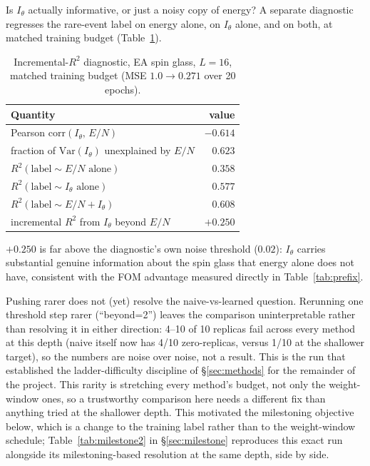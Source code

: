 \documentclass[a4paper,fleqn]{cas-sc}
\begin{document}
Is $I_\theta$ actually informative, or just a noisy copy of energy? A separate
diagnostic regresses the rare-event label on energy alone, on $I_\theta$ alone, and on
both, at matched training budget (Table~\ref{tab:diagnostic}).

\begin{table}[H]
\centering\small
\caption{Incremental-$R^2$ diagnostic, EA spin glass, $L=16$, matched training budget
	(MSE $1.0\to0.271$ over 20 epochs).}
\label{tab:diagnostic}
\begin{tabular}{lr}
	\toprule
	Quantity & value \\
	\midrule
	Pearson corr$(I_\theta,\,E/N)$ & $-0.614$ \\
	fraction of $\mathrm{Var}(I_\theta)$ unexplained by $E/N$ & $0.623$ \\
	$R^2(\text{label}\sim E/N\text{ alone})$ & $0.358$ \\
	$R^2(\text{label}\sim I_\theta\text{ alone})$ & $0.577$ \\
	$R^2(\text{label}\sim E/N+I_\theta)$ & $0.608$ \\
	incremental $R^2$ from $I_\theta$ beyond $E/N$ & $+0.250$ \\
	\bottomrule
\end{tabular}
\end{table}

$+0.250$ is far above the diagnostic's own noise threshold ($0.02$): $I_\theta$ carries
substantial genuine information about the spin glass that energy alone does not have,
consistent with the FOM advantage measured directly in Table~\ref{tab:prefix}.

Pushing rarer does not (yet) resolve the naive-vs-learned question. Rerunning one
threshold step rarer (``beyond=2'') leaves the comparison uninterpretable rather than
resolving it in either direction: 4--10 of 10 replicas fail across every method at this
depth (naive itself now has 4/10 zero-replicas, versus 1/10 at the shallower target), so
the numbers are noise over noise, not a result. This is the run that established the
ladder-difficulty discipline of \S\ref{sec:methods} for the remainder of the project.
This rarity is stretching every method's budget, not only the weight-window ones, so a
trustworthy comparison here needs a different fix than anything tried at the shallower
depth. This motivated the milestoning objective below, which is a change to the training
label rather than to the weight-window schedule; Table~\ref{tab:milestone2} in
\S\ref{sec:milestone} reproduces this exact run alongside its milestoning-based
resolution at the same depth, side by side.
\end{document}
